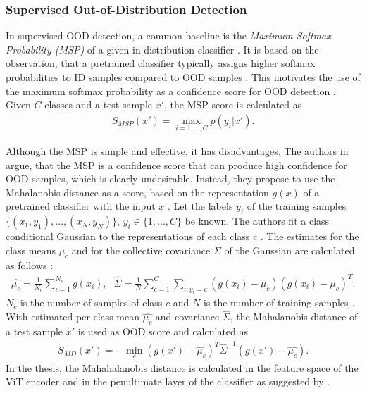 \subsubsection{Supervised Out-of-Distribution Detection}
In supervised OOD detection, a common baseline is the \textit{Maximum Softmax Probability (MSP)} of a given in-distribution classifier \citep{Hendrycks2016a}.
It is based on the observation, that a pretrained classifier typically assigns higher softmax probabilities to ID samples compared to OOD samples \citep{Hendrycks2016a}.
This motivates the use of the maximum softmax probability as a confidence score for OOD detection \citep{Hendrycks2016a}.
Given $C$ classes and a test sample $x'$, the MSP score is calculated as 
\begin{align}
	S_{MSP}(x')=\max_{i=1,\dots,C}p(y_i|x').
\end{align}	
\par
Although the MSP is simple and effective, it has disadvantages.
The authors in \citep{Lee2018} argue, that the MSP is a confidence score that can produce high confidence for OOD samples, which is clearly undesirable.
Instead, they propose to use the Mahalanobis distance as a score, based on the representation $g(x)$ of a pretrained classifier with the input $x$ \citep{Lee2018}.
Let the labels $y_i$ of the training samples $\{(x_1,y_1),\dots, (x_N,y_N)\}$, $y_i \in \{1,\dots,C\}$ be known.
The authors fit a class conditional Gaussian to the representations of each class $c$ \citep{Lee2018}.
The estimates for the class means $\mu_c$ and for the collective covariance $\Sigma$ of the Gaussian are calculated as follows \citep{Lee2018}:
\begin{align}
	\hat{\mu_c} = \frac{1}{N_c}\sum_{i=1}^{N_c}g(x_i), \hspace{8pt} \hat{\Sigma} = \frac{1}{N}\sum_{c=1}^{C}\sum_{i: y_i=c}(g(x_i)-\mu_c)(g(x_i)-\mu_c)^T.
\end{align}
$N_c$ is the number of samples of class $c$ and $N$ is the number of training samples \citep{Lee2018}.
With estimated per class mean $\hat{\mu_c}$ and covariance $\hat{\Sigma}$, the Mahalanobis distance of a test sample $x'$ is used as OOD score and calculated as \citep{Lee2018}
\begin{align}
	S_{MD}(x') = - \min_c (g(x')-\hat{\mu_c})^T\hat{\Sigma}^{-1}(g(x')-\hat{\mu_c}).
\end{align}
In the thesis, the Mahahalanobis distance is calculated in the feature space of the ViT encoder and in the penultimate layer of the classifier as suggested by \citep{Lee2018, Michels2023}.
